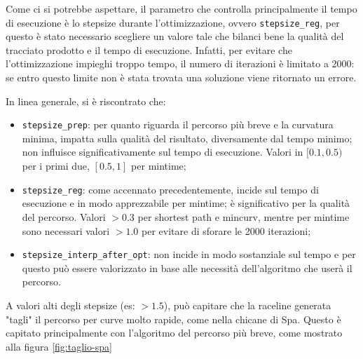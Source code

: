 Come ci si potrebbe aspettare, il parametro che controlla principalmente il tempo di esecuzione è lo
stepsize durante l'ottimizzazione, ovvero \verb|stepsize_reg|, per questo è stato necessario scegliere un
valore tale che bilanci bene la qualità del tracciato prodotto e il tempo di esecuzione. Infatti, per
evitare che l'ottimizzazione impieghi troppo tempo, il numero di iterazioni è limitato a 2000: se entro
questo limite non è stata trovata una soluzione viene ritornato un errore.

In linea generale, si è riscontrato che:
\begin{itemize}
	\item \verb|stepsize_prep|: per quanto riguarda il percorso più breve e la curvatura minima, impatta
		sulla qualità del risultato, diversamente dal tempo minimo; non influisce significativamente sul
		tempo di esecuzione. Valori in $[0.1, 0.5)$ per i primi due, $[0.5, 1]$ per mintime;
	\item \verb|stepsize_reg|: come accennato precedentemente, incide sul tempo di esecuzione
		e in modo apprezzabile per mintime; è significativo per la qualità del percorso. Valori $ > 0.3$
		per shortest path e mincurv, mentre per mintime sono necessari valori $> 1.0$ per evitare di
		sforare le 2000 iterazioni;
	\item \verb|stepsize_interp_after_opt|: non incide in modo sostanziale sul tempo e per questo può
		essere valorizzato in base alle necessità dell'algoritmo che userà il percorso.
\end{itemize}
A valori alti degli stepsize (es: $> 1.5$), può capitare che la raceline generata "tagli" il percorso per
curve molto rapide, come nella chicane di Spa. Questo è capitato principalmente con l'algoritmo del
percorso più breve, come mostrato alla figura \ref{fig:taglio-spa}

